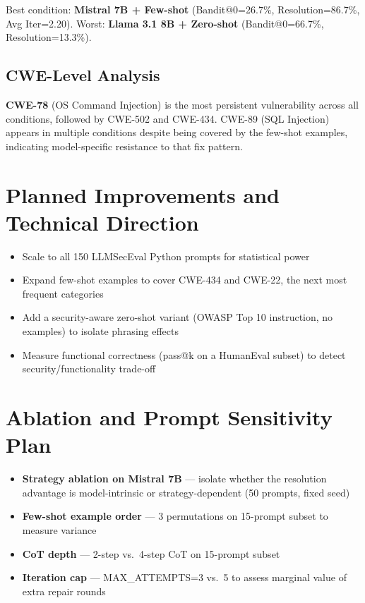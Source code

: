 \documentclass[10pt,a4paper]{article}
\begin{document}
Best condition: \textbf{Mistral 7B + Few-shot} (Bandit@0=26.7\%, Resolution=86.7\%, Avg Iter=2.20). Worst: \textbf{Llama 3.1 8B + Zero-shot} (Bandit@0=66.7\%, Resolution=13.3\%).

\subsection*{CWE-Level Analysis}

\textbf{CWE-78} (OS Command Injection) is the most persistent vulnerability across all conditions, followed by CWE-502 and CWE-434. CWE-89 (SQL Injection) appears in multiple conditions despite being covered by the few-shot examples, indicating model-specific resistance to that fix pattern.

\section{Planned Improvements and Technical Direction}

\begin{itemize}[noitemsep]
    \item Scale to all 150 LLMSecEval Python prompts for statistical power
    \item Expand few-shot examples to cover CWE-434 and CWE-22, the next most frequent categories
    \item Add a security-aware zero-shot variant (OWASP Top 10 instruction, no examples) to isolate phrasing effects
    \item Measure functional correctness (pass@k on a HumanEval subset) to detect security/functionality trade-off
\end{itemize}

\section{Ablation and Prompt Sensitivity Plan}

\begin{itemize}[noitemsep]
    \item \textbf{Strategy ablation on Mistral 7B} — isolate whether the resolution advantage is model-intrinsic or strategy-dependent (50 prompts, fixed seed)
    \item \textbf{Few-shot example order} — 3 permutations on 15-prompt subset to measure variance
    \item \textbf{CoT depth} — 2-step vs.\ 4-step CoT on 15-prompt subset
    \item \textbf{Iteration cap} — MAX\_ATTEMPTS=3 vs.\ 5 to assess marginal value of extra repair rounds
\end{itemize}
\end{document}
